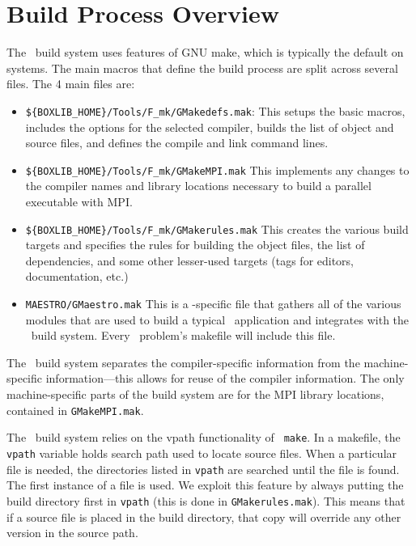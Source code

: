 \label{ch:make}

\section{Build Process Overview}

The \maestro\ build system uses features of GNU make, which is typically the 
default on systems.  The main macros that define the build process are 
split across several files.  The 4 main files are:
\begin{itemize}
\item {\tt \$\{BOXLIB\_HOME\}/Tools/F\_mk/GMakedefs.mak}:
  This setups the basic macros, includes the options for the selected
  compiler, builds the list of object and source files, and defines
  the compile and link command lines.

\item {\tt \$\{BOXLIB\_HOME\}/Tools/F\_mk/GMakeMPI.mak}
  This implements any changes to the compiler names and library
  locations necessary to build a parallel executable with MPI.

\item {\tt \$\{BOXLIB\_HOME\}/Tools/F\_mk/GMakerules.mak}
  This creates the various build targets and specifies the rules for
  building the object files, the list of dependencies, and some other
  lesser-used targets (tags for editors, documentation, etc.)

\item {\tt MAESTRO/GMaestro.mak}
  This is a \maestro-specific file that gathers all of the various
  modules that are used to build a typical \maestro\ application
  and integrates with the \boxlib\ build system.  Every \maestro\
  problem's makefile will include this file.

\end{itemize}


The \boxlib\ build system separates the compiler-specific information
from the machine-specific information---this allows for reuse of the
compiler information.  The only machine-specific parts of the build system
are for the MPI library locations, contained in {\tt GMakeMPI.mak}.

The \maestro\ build system relies on the vpath functionality of {\tt
make}.  In a makefile, the {\tt vpath} variable holds search path used
to locate source files.  When a particular file is needed, the
directories listed in {\tt vpath} are searched until the file is
found.  The first instance of a file is used.  We exploit this feature
by always putting the build directory first in {\tt vpath} (this is
done in {\tt GMakerules.mak}).  This means that if a source file is
placed in the build directory, that copy will override any other
version in the source path.


